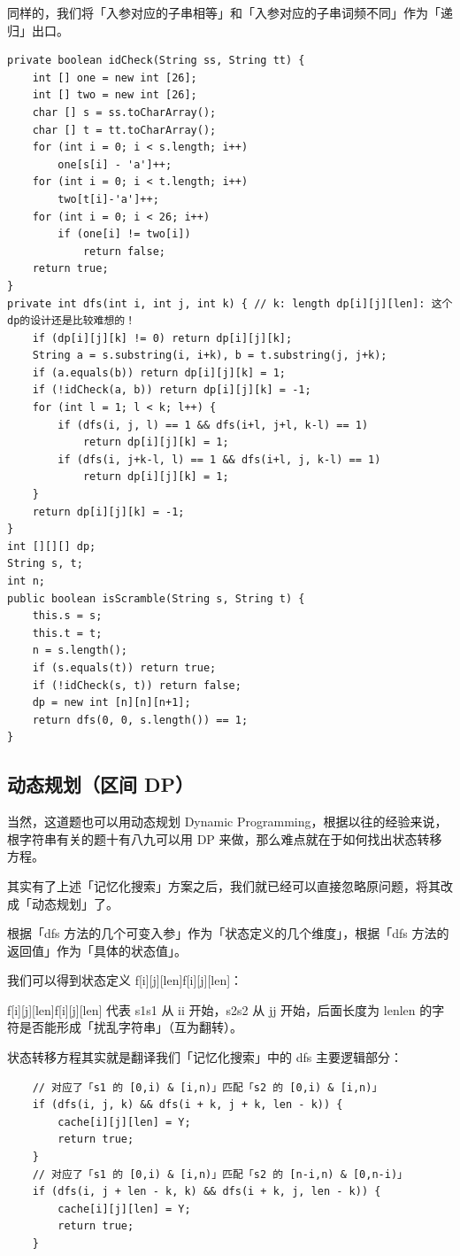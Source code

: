 \documentclass[9pt, b5paaper]{book}
\begin{document}
同样的，我们将「入参对应的子串相等」和「入参对应的子串词频不同」作为「递归」出口。
\begin{verbatim}
private boolean idCheck(String ss, String tt) {
    int [] one = new int [26];
    int [] two = new int [26];
    char [] s = ss.toCharArray();
    char [] t = tt.toCharArray();
    for (int i = 0; i < s.length; i++) 
        one[s[i] - 'a']++;
    for (int i = 0; i < t.length; i++) 
        two[t[i]-'a']++;
    for (int i = 0; i < 26; i++) 
        if (one[i] != two[i])
            return false;
    return true;
}
private int dfs(int i, int j, int k) { // k: length dp[i][j][len]: 这个dp的设计还是比较难想的！
    if (dp[i][j][k] != 0) return dp[i][j][k];
    String a = s.substring(i, i+k), b = t.substring(j, j+k);
    if (a.equals(b)) return dp[i][j][k] = 1;
    if (!idCheck(a, b)) return dp[i][j][k] = -1;
    for (int l = 1; l < k; l++) {
        if (dfs(i, j, l) == 1 && dfs(i+l, j+l, k-l) == 1)
            return dp[i][j][k] = 1;
        if (dfs(i, j+k-l, l) == 1 && dfs(i+l, j, k-l) == 1)
            return dp[i][j][k] = 1;
    }
    return dp[i][j][k] = -1;
}
int [][][] dp;
String s, t;
int n;
public boolean isScramble(String s, String t) {
    this.s = s;
    this.t = t;
    n = s.length();
    if (s.equals(t)) return true;
    if (!idCheck(s, t)) return false;
    dp = new int [n][n][n+1];
    return dfs(0, 0, s.length()) == 1;
}
\end{verbatim}
\subsection{动态规划（区间 DP）}
\label{sec-15-2-3}
当然，这道题也可以用动态规划 Dynamic Programming，根据以往的经验来说，根字符串有关的题十有八九可以用 DP 来做，那么难点就在于如何找出状态转移方程。

其实有了上述「记忆化搜索」方案之后，我们就已经可以直接忽略原问题，将其改成「动态规划」了。

根据「dfs 方法的几个可变入参」作为「状态定义的几个维度」，根据「dfs 方法的返回值」作为「具体的状态值」。

我们可以得到状态定义 f[i][j][len]f[i][j][len]：

f[i][j][len]f[i][j][len] 代表 s1s1 从 ii 开始，s2s2 从 jj 开始，后面长度为 lenlen 的字符是否能形成「扰乱字符串」（互为翻转）。

状态转移方程其实就是翻译我们「记忆化搜索」中的 dfs 主要逻辑部分：

\begin{verbatim}
    // 对应了「s1 的 [0,i) & [i,n)」匹配「s2 的 [0,i) & [i,n)」
    if (dfs(i, j, k) && dfs(i + k, j + k, len - k)) {
        cache[i][j][len] = Y;
        return true;
    }
    // 对应了「s1 的 [0,i) & [i,n)」匹配「s2 的 [n-i,n) & [0,n-i)」
    if (dfs(i, j + len - k, k) && dfs(i + k, j, len - k)) {
        cache[i][j][len] = Y;
        return true;
    }
\end{verbatim}
\end{document}
